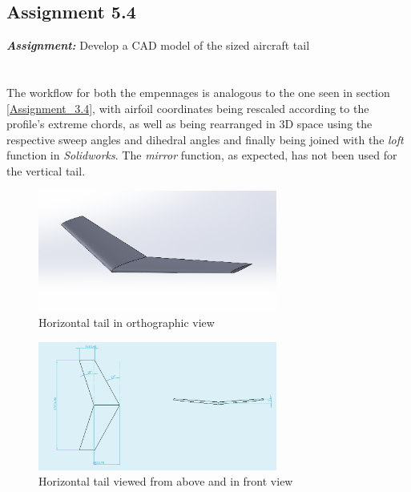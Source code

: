 \documentclass{article}
\begin{document}
\clearpage

\subsection{Assignment 5.4\label{Assignment_5.4}}

\textbf{\textit{Assignment:}} Develop a CAD model 
of the sized aircraft tail \\ \\ \\ 

The workflow for both the empennages is analogous to the one seen in section \ref{Assignment_3.4}, with airfoil coordinates
being rescaled according to the profile's extreme chords, as well as being rearranged in 3D space using 
the respective sweep angles and dihedral angles and finally being joined with the \textit{loft} function 
in \textit{Solidworks}.
The \textit{mirror} function, as expected, has not been used for the vertical tail. 

\begin{figure}[h!]
    \centering
    \includegraphics[width=0.7\textwidth]{Sources/Plots_and_Pictures/htail_cad.png}
    \caption{Horizontal tail in orthographic view}
    \label{horizontal_tail_CAD}
\end{figure}

\begin{figure}[h!]
    \centering
    \includegraphics[width=0.7\textwidth]{Sources/Plots_and_Pictures/htailpianta.png}
    \caption{Horizontal tail viewed from above and in front view}
    \label{horizontal_tail_pianta}
\end{figure}
\end{document}
